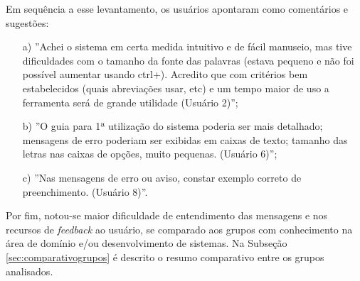 Em sequência a esse levantamento, os usuários apontaram como comentários e sugestões: 

\begin{enumerate}
    \item [a)] ''Achei o sistema em certa medida intuitivo e de fácil manuseio, mas tive dificuldades com o tamanho da fonte das palavras (estava pequeno e não foi possível aumentar usando ctrl+). Acredito que com critérios bem estabelecidos (quais abreviações usar, etc) e um tempo maior de uso a ferramenta será de grande utilidade (Usuário 2)'';
    \item[b)] ''O guia para 1ª utilização do sistema poderia ser mais detalhado; mensagens de erro poderiam ser exibidas em caixas de texto; tamanho das letras nas caixas de opções, muito pequenas. (Usuário 6)'';
    \item[c)] ''Nas mensagens de erro ou aviso, constar exemplo correto de preenchimento. (Usuário 8)''.   
\end{enumerate}

Por fim, notou-se maior dificuldade de entendimento das mensagens e nos recursos de \textit{feedback} ao usuário, se comparado aos grupos com conhecimento na área de domínio e/ou desenvolvimento de sistemas. Na Subseção \ref{sec:comparativogrupos} é descrito o resumo comparativo entre os grupos analisados.










